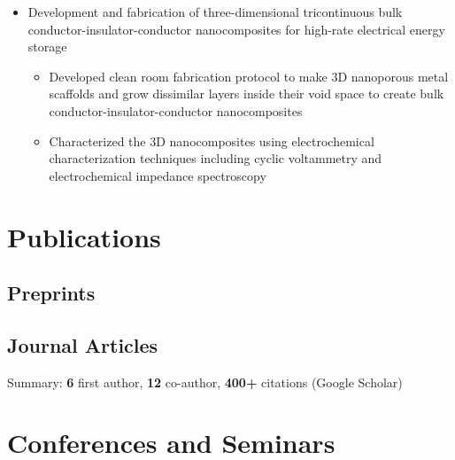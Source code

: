 \documentclass[11pt]{article} %
\begin{document}
\begin{itemize}
  \item Development and fabrication of three-dimensional tricontinuous bulk conductor-insulator-conductor nanocomposites for high-rate electrical energy storage
    \begin{itemize}
      \item Developed clean room fabrication protocol to make 3D nanoporous metal scaffolds and grow dissimilar layers inside their void space to create bulk conductor-insulator-conductor nanocomposites
      \item Characterized the 3D nanocomposites using electrochemical characterization techniques including cyclic voltammetry and electrochemical impedance spectroscopy
    \end{itemize}
\end{itemize}

\section*{Publications}
\subsection*{Preprints}
\begin{refsection}
  \nocite{*}
  \printbibliography[heading=none, type=misc]
\end{refsection}

\subsection{Journal Articles}
Summary: \textbf{6} first author, \textbf{12} co-author, \textbf{400+} citations (Google Scholar)

\begin{refsection}
  \nocite{*}
  \printbibliography[heading=none, type=article]
\end{refsection}

\section{Conferences and Seminars}
\setlength{\arrayrulewidth}{1mm} %
\renewcommand{\arraystretch}{1.4} %
\end{document}
